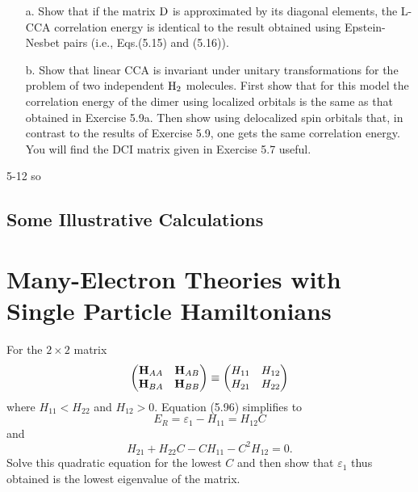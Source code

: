 \documentclass[a4paper]{book}
\newcounter{exercise}[chapter]
\newcounter{solution}[chapter]
\newcommand{\HH}{{\bf H}}
\begin{document}
	\begin{exercise}
	\begin{enumerate}
	
	\item[a.] Show that if the matrix ${\rm D}$ is approximated by its diagonal elements, the L-CCA correlation energy is identical to the result obtained using Epstein-Nesbet pairs (i.e., Eqs.(5.15) and (5.16)).
	
	\item[b.] Show that linear CCA is invariant under unitary transformations for the problem of two independent $\ce{H2}$ molecules. First show that for this model the correlation energy of the dimer using localized orbitals is the same as that obtained in Exercise 5.9a. Then show using delocalized spin orbitals that, in contrast to the results of Exercise 5.9, one gets the same correlation energy. You will find the DCI matrix given in Exercise 5.7 useful.
	
	\end{enumerate}
	
	\end{exercise}
	
	\begin{solution}
		5-12 so
	\end{solution}
	
	\subsection{Some Illustrative Calculations}
	
	\section{Many-Electron Theories with Single Particle Hamiltonians}
	
	\begin{exercise}
	For the $2 \times 2$ matrix
	\[
		\begin{pmatrix}
			\HH_{AA} & \HH_{AB} \\ \HH_{BA} & \HH_{BB} 
		\end{pmatrix} \equiv \begin{pmatrix}
		H_{11} & H_{12} \\ H_{21} & H_{22}
		\end{pmatrix}
	\]
	where $H_{11} < H_{22}$ and $H_{12} > 0$. Equation (5.96) simplifies to
	\[
		E_R = \varepsilon_1 - H_{11} = H_{12} C
	\]
	and
	\[
		H_{21} + H_{22} C - C H_{11} - C^2 H_{12} = 0.
	\]
	Solve this quadratic equation for the lowest $C$ and then show that $\varepsilon_1$ thus obtained is the lowest eigenvalue of the matrix.
	\end{exercise}
	
\end{document}
